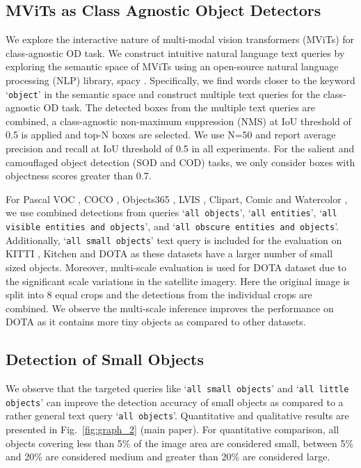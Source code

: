 \documentclass[runningheads]{llncs}
\newcommand{\txt}[1]{{\texttt{#1}}}
\begin{document}
\subsection{MViTs as Class Agnostic Object Detectors}
\label{appendix:class_agnostic_evaluation}
We explore the interactive nature of multi-modal vision transformers (MViTs) for class-agnostic OD task. We construct intuitive natural language text queries by exploring the semantic space of MViTs using an open-source natural language processing (NLP) library, spacy \cite{spacy}. Specifically, we find words closer to the keyword ‘\txt{object}’ in the semantic space and construct multiple text queries for the class-agnostic OD task. The detected boxes from the multiple text queries are combined, a class-agnostic non-maximum suppression (NMS) at IoU threshold of 0.5 is applied and top-N boxes are selected. We use N=50 and report average precision and recall at IoU threshold of 0.5 in all experiments. For the salient and camouflaged object detection (SOD and COD) tasks, we only consider boxes with objectness scores greater than 0.7.

For Pascal VOC \cite{voc}, COCO \cite{coco}, Objects365 \cite{shao2019objects365}, LVIS \cite{gupta2019lvis}, Clipart, Comic and Watercolor \cite{clipart-comic-water}, we use combined detections from queries ‘\txt{all objects}’, ‘\txt{all entities}’, ‘\txt{all visible entities and objects}’, and ‘\txt{all obscure entities and objects}’. Additionally, ‘\txt{all small objects}’ text query is included for the evaluation on KITTI \cite{kitti}, Kitchen \cite{kitchen} and DOTA \cite{dota} as these datasets have a larger number of small sized objects. Moreover, multi-scale evaluation is used for DOTA dataset due to the significant scale variations in the satellite imagery. Here the original image is split into 8 equal crops and the detections from the individual crops are combined. We observe the multi-scale inference improves the performance on DOTA as it contains more tiny objects as compared to other datasets.

\subsection{Detection of Small Objects}
We observe that the targeted queries like ‘\txt{all small objects}’ and ‘\txt{all little objects}’ can improve the detection accuracy of small objects as compared to a rather general text query ‘\txt{all objects}’. Quantitative and qualitative results are presented in Fig.~\ref{fig:graph_2} (main paper). For quantitative comparison, all objects covering less than 5\% of the image area are considered small, between 5\% and 20\% are considered medium and greater than 20\% are considered large. 
\end{document}
